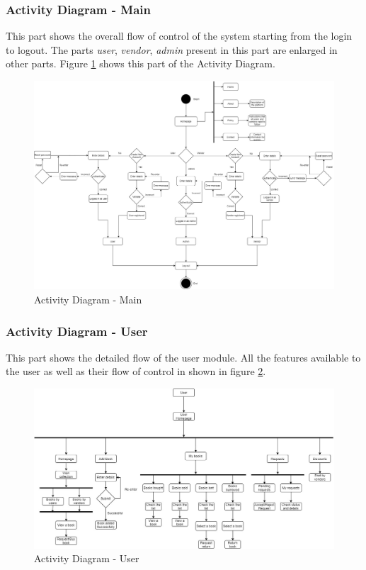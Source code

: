 \documentclass[conference]{IEEEtran}
\begin{document}
\subsubsection{Activity Diagram - Main}
This part shows the overall flow of control of the system starting from the login to logout. The parts \emph{user}, \emph{vendor}, \emph{admin} present in this part are enlarged in other parts. Figure \ref{fig:activitydiagrammain} shows this part of the Activity Diagram.
\begin{figure}[h]
     \centering
     \includegraphics[scale=0.15,margin=2,frame]{Activity Diagram-Main.jpg}
     \caption{Activity Diagram - Main}
     \label{fig:activitydiagrammain}
 \end{figure}
 \subsubsection{Activity Diagram - User}
 This part shows the detailed flow of the user module. All the features available to the user as well as their flow of control in shown in figure \ref{fig:activitydiagramuser}.
 \begin{figure}[H]
     \centering
     \includegraphics[scale=0.18,margin=2,frame]{Activity Diagram-User.jpg}
     \caption{Activity Diagram - User}
     \label{fig:activitydiagramuser}
 \end{figure}
\end{document}
